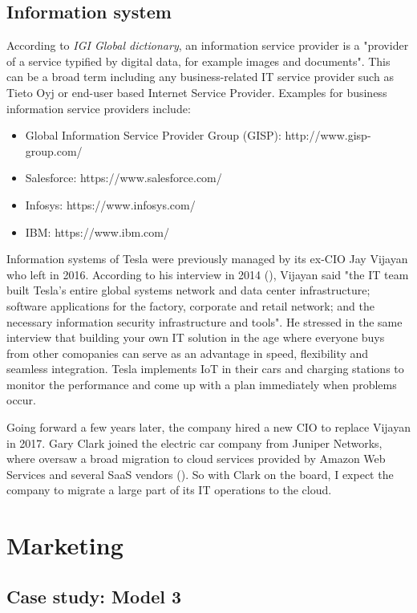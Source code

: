 \documentclass[12pt]{article}
\begin{document}
\subsection{Information system}

According to \textit{IGI Global dictionary}, an information service provider is a "provider of a service typified by digital data, for example images and documents". This can be a broad term including any business-related IT service provider such as Tieto Oyj or end-user based Internet Service Provider. Examples for business information service providers include:

\begin{itemize}
	\item{Global Information Service Provider Group (GISP): http://www.gisp-group.com/}
	\item{Salesforce: https://www.salesforce.com/}
	\item{Infosys: https://www.infosys.com/}
	\item{IBM: https://www.ibm.com/}
\end{itemize}

Information systems of Tesla were previously managed by its ex-CIO Jay Vijayan who left in 2016. According to his interview in 2014 (\cite{vi14}), Vijayan said "the IT team built Tesla's entire global systems network and data center infrastructure; software applications for the factory, corporate and retail network; and the necessary information security infrastructure and tools". He stressed in the same interview that building your own IT solution in the age where everyone buys from other comopanies can serve as an advantage in speed, flexibility and seamless integration. Tesla implements IoT in their cars and charging stations to monitor the performance and come up with a plan immediately when problems occur.

Going forward a few years later, the company hired a new CIO to replace Vijayan in 2017. Gary Clark joined the electric car company from Juniper Networks, where oversaw a broad migration to cloud services provided by Amazon Web Services and several SaaS vendors (\cite{bo17}). So with Clark on the board, I expect the company to migrate a large part of its IT operations to the cloud.

\section{Marketing}

\subsection{Case study: Model 3}
\end{document}
